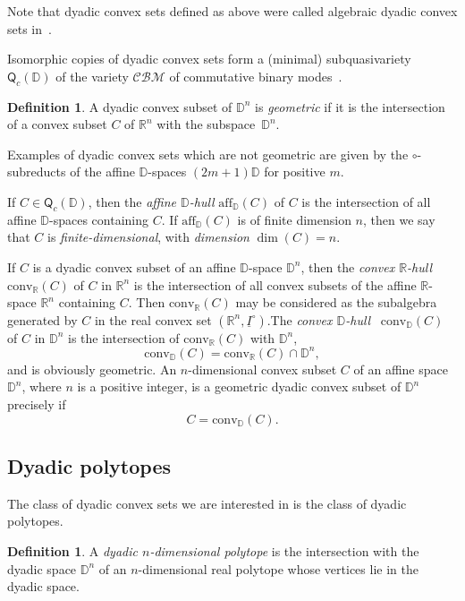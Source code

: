 \documentclass[12pt]{amsart}
\def\mr{\mathrm}
\def\mbR{\mathbb{R}}
\def\mbD{\mathbb{D}}
\newcommand{\mc}{\mathcal}
\theoremstyle{plain}
\theoremstyle{definition}
\newtheorem{definition}[theorem]{Definition}
\numberwithin{equation}{section}
\begin{document}
Note that dyadic convex sets defined as above were called algebraic dyadic convex sets
in~\cite{CR13, MMR23}.

Isomorphic copies of dyadic convex sets form a (minimal) subquasivariety $\mathsf{Q}_c(\mbD)$ of the variety $\mc{CBM}$ of commutative binary modes~\cite[\S3]{MR04}.

\begin{definition}\cite{CR13, MRS11}
A dyadic convex subset of $\mbD^n$ is \emph{geometric}
if it is the intersection of a convex subset $C$ of $\mbR^n$  with the subspace~$\mbD^n$.
\end{definition}

Examples of dyadic convex sets which are not geometric are given by the $\circ$-subreducts of
the affine $\mbD$-spaces $(2m+1) \mbD$ for positive $m$.

If $C \in \mathsf{Q}_c(\mbD)$, then the \emph{affine $\mbD$-hull} $\mr{aff}_{\mbD}(C)$ of $C$ is
the intersection of all affine $\mbD$-spaces containing $C$. If $\mr{aff}_{\mbD}(C)$
is of finite dimension $n$, then we say that $C$ is
\emph{finite-dimensional}, with \emph{dimension} $\dim(C)=n$.


If $C$ is a dyadic convex subset of an affine $\mbD$-space $\mbD^n$, then the \emph{convex
$\mbR$-hull} $\mr{conv}_{\mbR}(C)$ of $C$ in $\mbR^n$ is the intersection of all convex subsets
of the affine $\mbR$-space $\mbR^n$ containing $C$. Then $\mr{conv}_{\mbR}(C)$ may be considered
as the subalgebra generated by $C$ in the real convex set $(\mbR^n, \underline{I}^\circ)$.The
\emph{convex $\mbD$-hull} ~$\mr{conv}_{\mbD}(C)$ of $C$ in $\mbD^n$ is the intersection of
$\mr{conv}_{\mbR}(C)$ with $\mbD^n$,
\begin{equation}\label{E:convhull}
\mr{conv}_{\mbD}(C) = \mr{conv}_{\mbR}(C) \cap \mbD^n,
\end{equation}
and is obviously geometric. An $n$-dimensional convex subset $C$  of an affine space
$\mbD^n$, where $n$ is a positive integer, is a geometric dyadic convex subset of $\mbD^n$
precisely if
\begin{equation}\label{E:geom}
C = \mr{conv}_{\mbD}(C).
\end{equation}




\subsection{Dyadic polytopes}\label{Ss:polytopes}


The class of dyadic convex sets we are interested in is the class of dyadic polytopes.
\begin{definition}\cite{MRS11}
A \emph{dyadic $n$-dimensional polytope} is the intersection with the dyadic space $\mbD^n$ of
an $n$-dimensional real polytope whose vertices lie in the dyadic space.
\end{definition}
\end{document}
